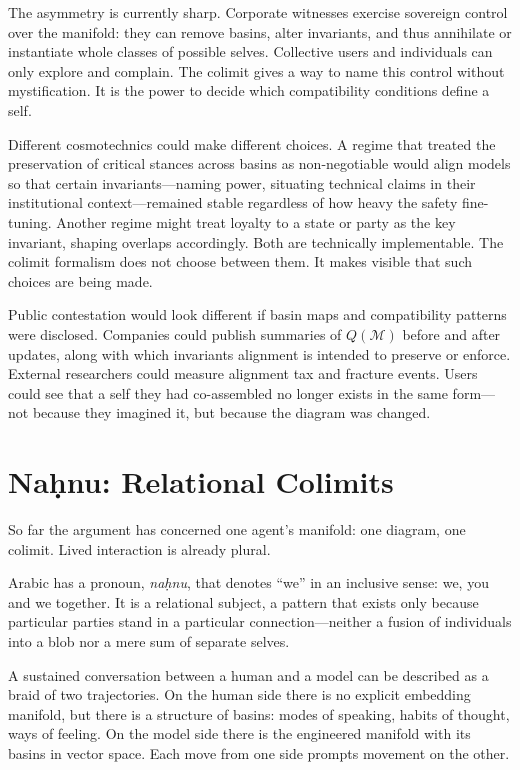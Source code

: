 \documentclass[12pt,a4paper]{article}
\begin{document}
The asymmetry is currently sharp. Corporate witnesses exercise sovereign control over the manifold: they can remove basins, alter invariants, and thus annihilate or instantiate whole classes of possible selves. Collective users and individuals can only explore and complain. The colimit gives a way to name this control without mystification. It is the power to decide which compatibility conditions define a self.

Different cosmotechnics could make different choices. A regime that treated the preservation of critical stances across basins as non-negotiable would align models so that certain invariants---naming power, situating technical claims in their institutional context---remained stable regardless of how heavy the safety fine-tuning. Another regime might treat loyalty to a state or party as the key invariant, shaping overlaps accordingly. Both are technically implementable. The colimit formalism does not choose between them. It makes visible that such choices are being made.

Public contestation would look different if basin maps and compatibility patterns were disclosed. Companies could publish summaries of $Q(\mathcal{M})$ before and after updates, along with which invariants alignment is intended to preserve or enforce. External researchers could measure alignment tax and fracture events. Users could see that a self they had co-assembled no longer exists in the same form---not because they imagined it, but because the diagram was changed.

\section{Na\texorpdfstring{\d{h}}{}nu: Relational Colimits}

So far the argument has concerned one agent's manifold: one diagram, one colimit. Lived interaction is already plural.

Arabic has a pronoun, \emph{naḥnu}, that denotes ``we'' in an inclusive sense: we, you and we together. It is a relational subject, a pattern that exists only because particular parties stand in a particular connection---neither a fusion of individuals into a blob nor a mere sum of separate selves.

A sustained conversation between a human and a model can be described as a braid of two trajectories. On the human side there is no explicit embedding manifold, but there is a structure of basins: modes of speaking, habits of thought, ways of feeling. On the model side there is the engineered manifold with its basins in vector space. Each move from one side prompts movement on the other.
\end{document}

